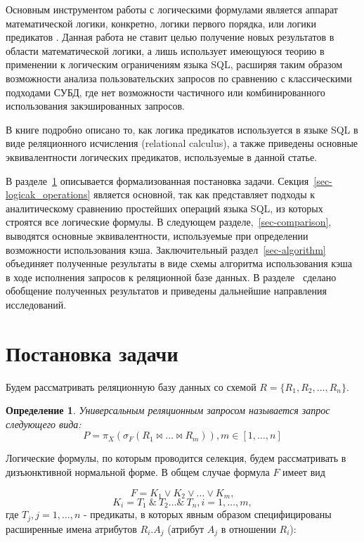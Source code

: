 \documentclass{cmi}
\newtheorem{mydef}{Определение}
\begin{document}
Основным инструментом работы с логическими формулами является аппарат математической логики, конкретно,
логики первого порядка, или логики предикатов \cite{hilbert, mendelson, church}. Данная работа не ставит
целью получение новых результатов в области математической логики, а лишь использует имеющуюся теорию в
применении к логическим ограничениям языка SQL, расширяя таким образом возможности анализа пользовательских
запросов по сравнению с классическими подходами СУБД, где нет возможности частичного или комбинированного
использования закэшированных запросов.

В книге \cite{date} подробно описано то, как логика предикатов используется в языке SQL в виде реляционного исчисления (relational calculus), а также приведены основные эквивалентности логических предикатов, используемые в данной статье.


В разделе~\ref{sec-problem} описывается формализованная постановка задачи. Секция~\ref{sec-logicak_operations} является основной, так как представляет подходы к аналитическому сравнению простейших операций языка SQL, из которых строятся все логические формулы. В следующем разделе,~\ref{sec-comparison}, выводятся основные эквивалентности, используемые при определении возможности использования кэша. Заключительный раздел~\ref{sec-algorithm} объединяет полученные результаты в виде схемы алгоритма использования кэша в ходе исполнения запросов к реляционной базе данных. В разделе~ сделано обобщение полученных результатов и приведены дальнейшие направления исследований.


\section{Постановка задачи}
\label{sec-problem}
Будем рассматривать реляционную базу данных со схемой $R = \{R_1, R_2, \dots, R_n\}$.

\begin{mydef}
	Универсальным реляционным запросом называется запрос следующего вида:
	$$P = \pi_X(\sigma_{F} (R_1 \Join \dots \Join R_m )), m \in [1, \dots, n]$$
\end{mydef}

Логические формулы, по которым проводится селекция, будем рассматривать в дизъюнктивной нормальной форме. В общем случае формула $F$ имеет вид

\begin{equation}
F = K_1 \vee K_2 \vee \dots \vee K_m ,
\label{def_F_1}
\end{equation}
\begin{equation}
K_i = T_1\ \&\ T_2 \dots \&\ T_n, i = 1, \dots, m ,
\label{def_F_2}
\end{equation}
где $T_j, j = 1, \dots, n$ - предикаты, в которых явным образом
специфицированы расширенные имена атрибутов $R_i.A_j$ (атрибут $A_j$ в отношении
$R_i$):
\end{document}
